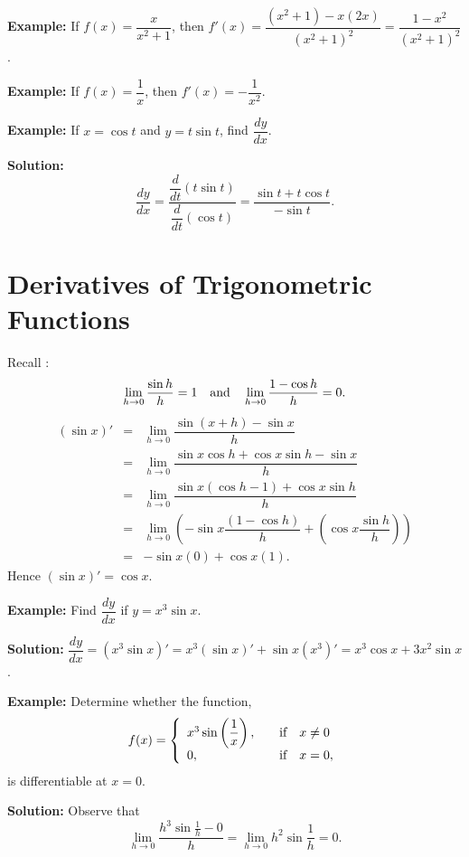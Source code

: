 \documentclass[titlepage,a4paper,12pt]{report}
\begin{document}
\noindent \textbf{Example:} If $f(x)=\dfrac{x}{x^2+1}$, then $f'(x)=\dfrac{(x^2+1)-x(2x)}{(x^2+1)^2}=\dfrac{1-x^2}{(x^2+1)^2}$.

\noindent \textbf{Example:} If $f(x)=\dfrac{1}{x}$, then $f'(x)=-\dfrac{1}{x^2}$.

\noindent \textbf{Example:} If $x=\cos t$ and $y=t\sin t$, find $\dfrac{dy}{dx}$.

\noindent \textbf{Solution:} \begin{equation*}
\dfrac{dy}{dx}=\dfrac{\dfrac{d}{dt}(t\sin t)}{\dfrac{d}{dt}(\cos t)}=\dfrac{\sin t+t\cos t}{-\sin t}.
\end{equation*}
\section{Derivatives of Trigonometric Functions}
Recall : 
\begin{equation*}
\lim _{h\rightarrow 0} \dfrac{\sin h}{ h}=1 \quad \hbox{and} \quad \lim _{h\rightarrow 0} \dfrac{1-\cos h}{h}=0.
\end{equation*}
\begin{eqnarray*}
(\sin x)' &=& \lim _{h\rightarrow 0} \dfrac{\sin (x+h)-\sin x}{h}\\
&=& \lim _{h\rightarrow 0} \dfrac{\sin x \cos h +\cos x \sin h -\sin x}{h}\\
&=& \lim _{h\rightarrow 0} \dfrac{\sin x (\cos h-1)+\cos x \sin h}{h}\\
&=& \lim _{h\rightarrow 0} \left(-\sin x \dfrac{(1-\cos h)}{h}+\left(\cos x\dfrac{\sin h}{h}\right)\right)\\
&=& -\sin x (0)+\cos x (1).
\end{eqnarray*}
Hence $(\sin x)'=\cos x$.

\noindent \textbf{Example:} Find $\dfrac{dy}{dx}$ if $y=x^3\sin x$.

\noindent \textbf{Solution:} $\dfrac{dy}{dx}=(x^3\sin x)'=x^3(\sin x)'+\sin x (x^3)'=x^3\cos x +3x^2\sin x$.

\noindent \textbf{Example:} Determine whether the function, 
\[ f(x) = \left\{ 
\begin{array}{l l}
  x^3\sin \left(\dfrac{1}{x}\right), & \quad \hbox{if}~~~ x\neq 0 \\
 0, & \quad \hbox{if}~~~ x=0,\\ \end{array} \right. \]
 is differentiable at $x=0$.
 
\noindent \textbf{Solution:}  Observe that 
\begin{equation*}
\lim _{h\rightarrow 0} \dfrac{h^3\sin \frac{1}{h}-0}{h}=\lim _{h\rightarrow 0}h^2\sin \frac{1}{h}=0.
\end{equation*}
\end{document}
